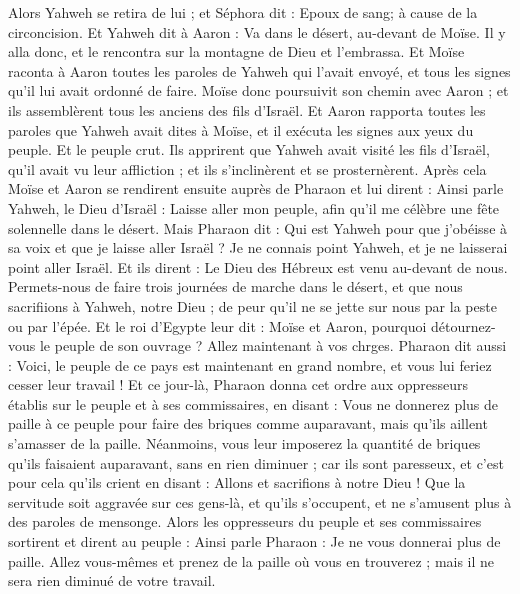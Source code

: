 \begin{multicols}{2}
Alors Yahweh se retira de lui ; et Séphora dit : Epoux de sang; à cause de la circoncision.
Et Yahweh dit à Aaron : Va dans le désert, au-devant de Moïse. Il y alla donc, et le rencontra sur la montagne de Dieu et l’embrassa.
Et Moïse raconta à Aaron toutes les paroles de Yahweh qui l'avait envoyé, et tous les signes qu'il lui avait ordonné de faire.
Moïse donc poursuivit son chemin avec Aaron ; et ils assemblèrent tous les anciens des fils d'Israël.
Et Aaron rapporta toutes les paroles que Yahweh avait dites à Moïse, et il exécuta les signes aux yeux du peuple.
Et le peuple crut. Ils apprirent que Yahweh avait visité les fils d'Israël, qu'il avait vu leur affliction ; et ils s'inclinèrent et se prosternèrent.
\VerseOne{}Après cela Moïse et Aaron se rendirent ensuite auprès de Pharaon et lui dirent : Ainsi parle Yahweh, le Dieu d'Israël : Laisse aller mon peuple, afin qu'il me célèbre une fête solennelle dans le désert.
Mais Pharaon dit : Qui est Yahweh pour que j'obéisse à sa voix et que je laisse aller Israël ? Je ne connais point Yahweh, et je ne laisserai point aller Israël.
Et ils dirent : Le Dieu des Hébreux est venu au-devant de nous. Permets-nous de faire trois journées de marche dans le désert, et que nous sacrifiions à Yahweh, notre Dieu ; de peur qu'il ne se jette sur nous par la peste ou par l'épée.
Et le roi d'Egypte leur dit : Moïse et Aaron, pourquoi détournez-vous le peuple de son ouvrage ? Allez maintenant à vos chrges.
Pharaon dit aussi : Voici, le peuple de ce pays est maintenant en grand nombre, et vous lui feriez cesser leur travail !
Et ce jour-là, Pharaon donna cet ordre aux oppresseurs établis sur le peuple et à ses commissaires, en disant :
Vous ne donnerez plus de paille à ce peuple pour faire des briques comme auparavant, mais qu'ils aillent s’amasser de la paille.
Néanmoins, vous leur imposerez la quantité de briques qu'ils faisaient auparavant, sans en rien diminuer ; car ils sont paresseux, et c'est pour cela qu'ils crient en disant : Allons et sacrifions à notre Dieu !
Que la servitude soit aggravée sur ces gens-là, et qu'ils s'occupent, et ne s'amusent plus à des paroles de mensonge.
Alors les oppresseurs du peuple et ses commissaires sortirent et dirent au peuple : Ainsi parle Pharaon : Je ne vous donnerai plus de paille.
Allez vous-mêmes et prenez de la paille où vous en trouverez ; mais il ne sera rien diminué de votre travail.

\end{multicols}
